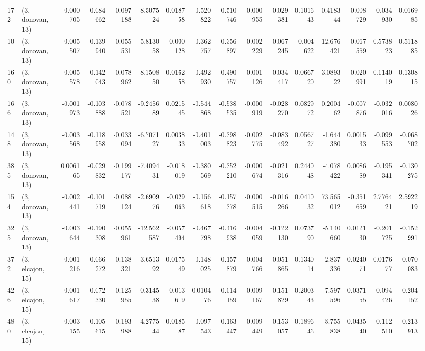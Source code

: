\begin{tabular}{llrrrrrrrrrrrrrr}
172 &  (3, donovan, 13) &  -0.000705 & -0.084662 & -0.097188 &   -8.507524 &  0.018758 &  -0.520822 & -0.510746 & -0.000955 & -0.029381 &  0.101643 &    0.418344 & -0.008729 & -0.034930 &  0.016985 \\
10  &  (3, donovan, 13) &  -0.005507 & -0.139940 & -0.055531 &   -5.813058 & -0.000128 &  -0.362757 & -0.356897 & -0.002229 & -0.067245 & -0.004622 &   12.676421 & -0.067569 &  0.573823 &  0.511885 \\
160 &  (3, donovan, 13) &  -0.005578 & -0.142043 & -0.078962 &   -8.150850 &  0.016258 &  -0.492930 & -0.490757 & -0.001126 & -0.034417 &  0.066720 &    3.089322 & -0.020991 &  0.114019 &  0.130815 \\
166 &  (3, donovan, 13) &  -0.001973 & -0.103888 & -0.078521 &   -9.245689 &  0.021545 &  -0.544868 & -0.538535 & -0.000919 & -0.028270 &  0.082972 &    0.200462 & -0.007876 & -0.032016 &  0.008026 \\
148 &  (3, donovan, 13) &  -0.003568 & -0.118958 & -0.033094 &   -6.707127 &  0.003833 &  -0.401003 & -0.398823 & -0.002775 & -0.083492 &  0.056727 &   -1.644380 &  0.001533 & -0.099553 & -0.068702 \\
385 &  (3, donovan, 13) &   0.006165 & -0.029832 & -0.199177 &   -7.409431 & -0.018019 &  -0.380569 & -0.352210 & -0.000674 & -0.021316 &  0.244048 &   -4.078422 &  0.008689 & -0.195341 & -0.130275 \\
154 &  (3, donovan, 13) &  -0.002441 & -0.101719 & -0.088124 &   -2.690976 & -0.029063 &  -0.156618 & -0.157378 & -0.000515 & -0.016266 &  0.041032 &   73.565012 & -0.361659 &  2.776421 &  2.592219 \\
325 &  (3, donovan, 13) &  -0.003644 & -0.190308 & -0.055961 &  -12.562587 & -0.057494 &  -0.467798 & -0.416938 & -0.004059 & -0.122130 &  0.073790 &   -5.140660 &  0.012130 & -0.201725 & -0.152991 \\
372 &  (3, elcajon, 15) &  -0.001216 & -0.066272 & -0.138321 &   -3.651392 &  0.017549 &  -0.148025 & -0.157879 & -0.004766 & -0.051865 &  0.134014 &   -2.837336 &  0.024071 &  0.017677 & -0.070083 \\
426 &  (3, elcajon, 15) &  -0.001617 & -0.072330 & -0.125955 &   -0.314538 & -0.013619 &   0.010476 & -0.014159 & -0.009167 & -0.151829 &  0.200343 &   -7.597596 &  0.037155 & -0.094426 & -0.204152 \\
480 &  (3, elcajon, 15) &  -0.003155 & -0.105615 & -0.193988 &   -4.277544 &  0.018587 &  -0.097543 & -0.163447 & -0.009449 & -0.153057 &  0.189646 &   -8.755838 &  0.043540 & -0.112510 & -0.213913 \\

\end{tabular}
